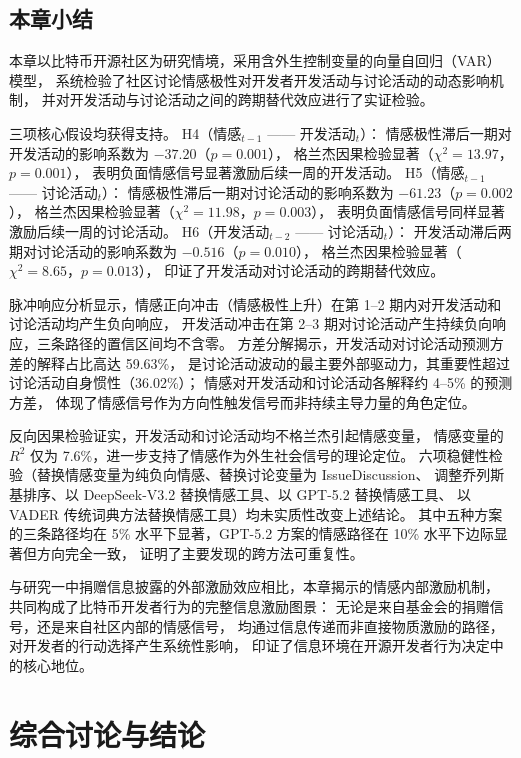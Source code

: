 \documentclass[
    type = master, %
    degree = professional,        %
    decl-page,  %
    twoside,                %
    fontset = fandol %
  ]{njuthesis}
\begin{document}
\section{本章小结}

本章以比特币开源社区为研究情境，采用含外生控制变量的向量自回归（VAR）模型，
系统检验了社区讨论情感极性对开发者开发活动与讨论活动的动态影响机制，
并对开发活动与讨论活动之间的跨期替代效应进行了实证检验。

三项核心假设均获得支持。
H4（情感$_{t-1}$ —— 开发活动$_t$）：
情感极性滞后一期对开发活动的影响系数为 $-37.20$（$p = 0.001$），
格兰杰因果检验显著（$\chi^2 = 13.97$，$p = 0.001$），
表明负面情感信号显著激励后续一周的开发活动。
H5（情感$_{t-1}$ —— 讨论活动$_t$）：
情感极性滞后一期对讨论活动的影响系数为 $-61.23$（$p = 0.002$），
格兰杰因果检验显著（$\chi^2 = 11.98$，$p = 0.003$），
表明负面情感信号同样显著激励后续一周的讨论活动。
H6（开发活动$_{t-2}$ —— 讨论活动$_t$）：
开发活动滞后两期对讨论活动的影响系数为 $-0.516$（$p = 0.010$），
格兰杰因果检验显著（$\chi^2 = 8.65$，$p = 0.013$），
印证了开发活动对讨论活动的跨期替代效应。

脉冲响应分析显示，情感正向冲击（情感极性上升）在第 1--2 期内对开发活动和讨论活动均产生负向响应，
开发活动冲击在第 2--3 期对讨论活动产生持续负向响应，三条路径的置信区间均不含零。
方差分解揭示，开发活动对讨论活动预测方差的解释占比高达 59.63\%，
是讨论活动波动的最主要外部驱动力，其重要性超过讨论活动自身惯性（36.02\%）；
情感对开发活动和讨论活动各解释约 4--5\% 的预测方差，
体现了情感信号作为方向性触发信号而非持续主导力量的角色定位。

反向因果检验证实，开发活动和讨论活动均不格兰杰引起情感变量，
情感变量的 $R^2$ 仅为 7.6\%，进一步支持了情感作为外生社会信号的理论定位。
六项稳健性检验（替换情感变量为纯负向情感、替换讨论变量为 IssueDiscussion、
调整乔列斯基排序、以 DeepSeek-V3.2 替换情感工具、以 GPT-5.2 替换情感工具、
以 VADER 传统词典方法替换情感工具）均未实质性改变上述结论。
其中五种方案的三条路径均在 5\% 水平下显著，GPT-5.2 方案的情感路径在 10\% 水平下边际显著但方向完全一致，
证明了主要发现的跨方法可重复性。

与研究一中捐赠信息披露的外部激励效应相比，本章揭示的情感内部激励机制，
共同构成了比特币开发者行为的完整信息激励图景：
无论是来自基金会的捐赠信号，还是来自社区内部的情感信号，
均通过信息传递而非直接物质激励的路径，对开发者的行动选择产生系统性影响，
印证了信息环境在开源开发者行为决定中的核心地位。



\chapter{综合讨论与结论}
\end{document}
